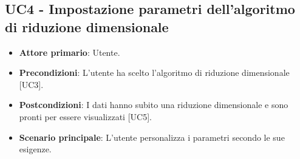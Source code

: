 \subsection{UC4 - Impostazione parametri dell'algoritmo di riduzione dimensionale}
\begin{itemize}
	\item \textbf{Attore primario}: Utente.
	\item \textbf{Precondizioni}: L'utente ha scelto l'algoritmo di riduzione dimensionale [UC3].
	\item \textbf{Postcondizioni}: I dati hanno subito una riduzione dimensionale e sono pronti per essere visualizzati [UC5].
	\item \textbf{Scenario principale}: L'utente personalizza i parametri secondo le sue esigenze.
\end{itemize}